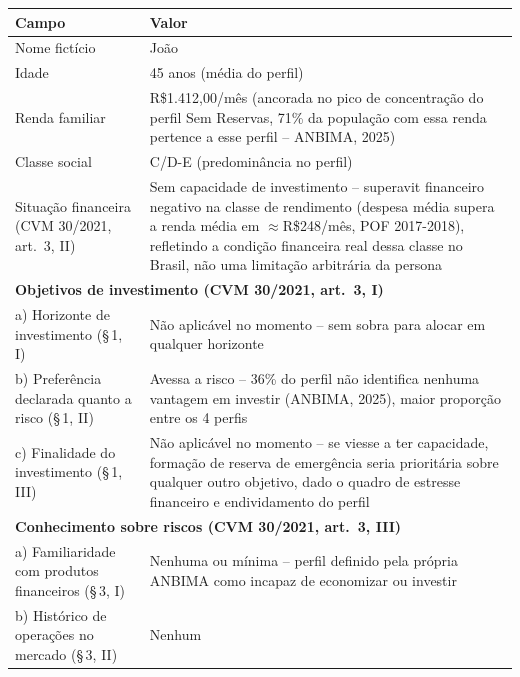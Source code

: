 \begin{quadro}[htbp]
  \centering
  \caption{Persona 1 -- Perfil Sem Reservas (52\% da popula\c{c}\~ao)}
  \label{qua:persona-semreservas}
  \begin{tabular}{p{5cm}p{8cm}}
    \toprule
    \textbf{Campo} & \textbf{Valor} \\
    \midrule
    Nome fict\'icio & Jo\~ao \\
    Idade & 45 anos (m\'edia do perfil) \\
    Renda familiar & R\$1.412,00/m\^es (ancorada no pico de concentra\c{c}\~ao do perfil Sem Reservas, 71\% da popula\c{c}\~ao com essa renda pertence a esse perfil -- ANBIMA, 2025) \\
    Classe social & C/D-E (predomin\^ancia no perfil) \\
    Situa\c{c}\~ao financeira (CVM 30/2021, art.\ 3\textordmasculine{}, II) & Sem capacidade de investimento -- superavit financeiro negativo na classe de rendimento (despesa m\'edia supera a renda m\'edia em \(\approx\)R\$248/m\^es, POF 2017-2018), refletindo a condi\c{c}\~ao financeira real dessa classe no Brasil, n\~ao uma limita\c{c}\~ao arbitr\'aria da persona \\
    \multicolumn{2}{l}{\textbf{Objetivos de investimento (CVM 30/2021, art.\ 3\textordmasculine{}, I)}} \\
    \quad a) Horizonte de investimento (\S\,1\textordmasculine{}, I) & N\~ao aplic\'avel no momento -- sem sobra para alocar em qualquer horizonte \\
    \quad b) Prefer\^encia declarada quanto a risco (\S\,1\textordmasculine{}, II) & Avessa a risco -- 36\% do perfil n\~ao identifica nenhuma vantagem em investir (ANBIMA, 2025), maior propor\c{c}\~ao entre os 4 perfis \\
    \quad c) Finalidade do investimento (\S\,1\textordmasculine{}, III) & N\~ao aplic\'avel no momento -- se viesse a ter capacidade, forma\c{c}\~ao de reserva de emerg\^encia seria priorit\'aria sobre qualquer outro objetivo, dado o quadro de estresse financeiro e endividamento do perfil \\
    \multicolumn{2}{l}{\textbf{Conhecimento sobre riscos (CVM 30/2021, art.\ 3\textordmasculine{}, III)}} \\
    \quad a) Familiaridade com produtos financeiros (\S\,3\textordmasculine{}, I) & Nenhuma ou m\'inima -- perfil definido pela pr\'opria ANBIMA como incapaz de economizar ou investir \\
    \quad b) Hist\'orico de opera\c{c}\~oes no mercado (\S\,3\textordmasculine{}, II) & Nenhum \\

\end{tabular}
\end{quadro}
